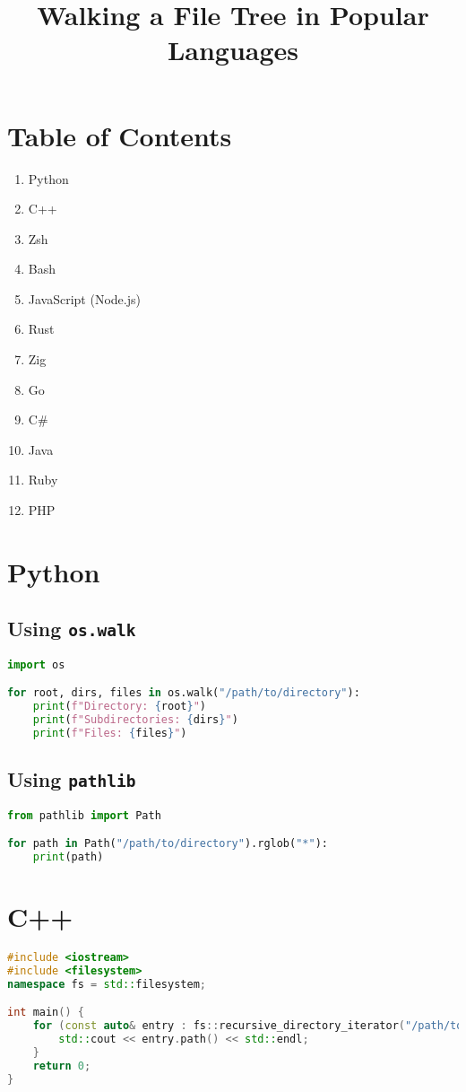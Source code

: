 \documentclass{article}
\title{Walking a File Tree in Popular Languages}
\author{}
\date{}
\begin{document}
\maketitle

\section*{Table of Contents}
\begin{enumerate}
  \item Python
  \item C++
  \item Zsh
  \item Bash
  \item JavaScript (Node.js)
  \item Rust
  \item Zig
  \item Go
  \item C\#
  \item Java
  \item Ruby
  \item PHP
\end{enumerate}

\newpage

\section{Python}
\subsection{Using \texttt{os.walk}}
\begin{lstlisting}[language=Python]
import os

for root, dirs, files in os.walk("/path/to/directory"):
    print(f"Directory: {root}")
    print(f"Subdirectories: {dirs}")
    print(f"Files: {files}")
\end{lstlisting}

\subsection{Using \texttt{pathlib}}
\begin{lstlisting}[language=Python]
from pathlib import Path

for path in Path("/path/to/directory").rglob("*"):
    print(path)
\end{lstlisting}

\section{C++}
\begin{lstlisting}[language=C++]
#include <iostream>
#include <filesystem>
namespace fs = std::filesystem;

int main() {
    for (const auto& entry : fs::recursive_directory_iterator("/path/to/directory")) {
        std::cout << entry.path() << std::endl;
    }
    return 0;
}
\end{lstlisting}
\end{document}
